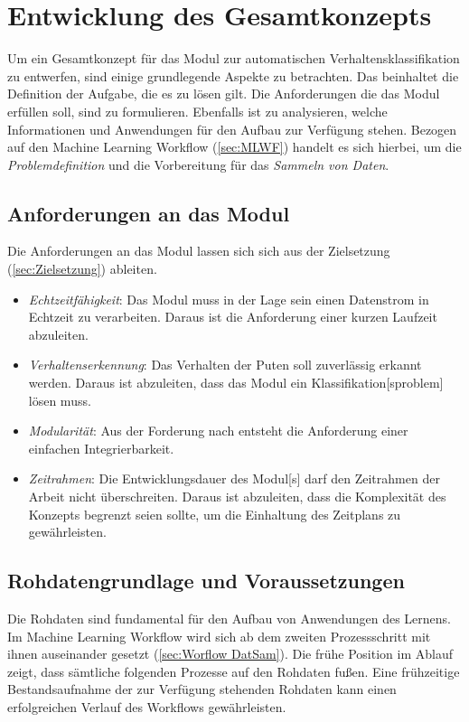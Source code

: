 \section{Entwicklung des Gesamtkonzepts} \label{sec:Meth gesamtkonzept}
Um ein Gesamtkonzept für das \gls{Modul} zur automatischen Verhaltensklassifikation zu entwerfen, sind einige grundlegende Aspekte zu betrachten. Das beinhaltet die Definition der Aufgabe, die es zu lösen gilt. Die Anforderungen die das \gls{Modul} erfüllen soll, sind zu formulieren. Ebenfalls ist zu analysieren, welche Informationen und Anwendungen für den Aufbau zur Verfügung stehen. Bezogen auf den \gls{Machine Learning Workflow} (\ref{sec:MLWF}) handelt es sich hierbei, um die \textit{Problemdefinition} und die Vorbereitung für das \textit{Sammeln von Daten}. \par

\subsection{Anforderungen an das Modul} \label{sec:Meth Anforderungen}

Die Anforderungen an das \gls{Modul} lassen sich sich aus der Zielsetzung (\ref{sec:Zielsetzung}) ableiten. 

\begin{itemize}
    \item \textit{Echtzeitfähigkeit}: Das \gls{Modul} muss in der Lage sein einen Datenstrom in Echtzeit zu verarbeiten. Daraus ist die Anforderung einer kurzen Laufzeit abzuleiten.
    \item \textit{Verhaltenserkennung}: Das Verhalten der Puten soll zuverlässig erkannt werden. Daraus ist abzuleiten, dass das \gls{Modul} ein \gls{Klassifikation}[sproblem] lösen muss.
    \item \textit{Modularität}: Aus der Forderung nach  entsteht die Anforderung einer einfachen Integrierbarkeit.
    \item \textit{Zeitrahmen}: Die Entwicklungsdauer des \gls{Modul}[s] darf den Zeitrahmen der Arbeit nicht überschreiten. Daraus ist abzuleiten, dass die Komplexität des Konzepts begrenzt seien sollte, um die Einhaltung des Zeitplans zu gewährleisten.
\end{itemize}

\subsection{Rohdatengrundlage und Voraussetzungen} \label{sec:Meth RohDat}
Die Rohdaten sind fundamental für den Aufbau von Anwendungen des  Lernens. Im \gls{Machine Learning Workflow} wird sich ab dem zweiten Prozessschritt mit ihnen auseinander gesetzt (\ref{sec:Worflow DatSam}). Die frühe Position im Ablauf zeigt, dass sämtliche folgenden Prozesse auf den Rohdaten fußen. Eine frühzeitige Bestandsaufnahme der zur Verfügung stehenden Rohdaten kann einen erfolgreichen Verlauf des Workflows gewährleisten. \par

